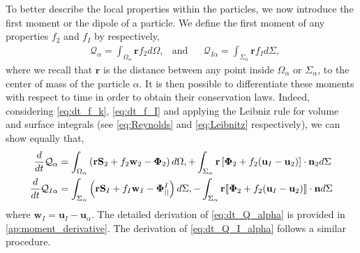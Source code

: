 To better describe the local properties within the particles, we now introduce the first moment or the dipole of a particle.
We define the first moment of any properties $f_2$ and $f_I$ by respectively,
\begin{align}
    &\mathcal{Q}_\alpha 
    = \int_{\Omega_\alpha} \textbf{r} f_2 d\Omega,
    &\text{and}&
    &\mathcal{Q}_{I\alpha}
    = \int_{\Sigma_\alpha} \textbf{r} f_I d\Sigma,
    \label{eq:first_moment_definition}
\end{align}
where we recall that $\textbf{r}$ is the distance between any point inside $\Omega_\alpha$ or $\Sigma_\alpha$, to the center of mass of the particle $\alpha$.
It is then possible to differentiate these moments with respect to time in order to obtain their conservation laws.
Indeed, considering \ref{eq:dt_f_k}, \ref{eq:dt_f_I} and applying the Leibniz rule for volume and surface integrals (see \ref{eq:Reynolds} and \ref{eq:Leibnitz} respectively), we can show equally that,
\begin{align}
    \frac{d}{d t} \mathcal{Q}_\alpha
    &= \int_{\Omega_\alpha} \left(
        \textbf{r} \textbf{S}_2         
        + f_2  \textbf{w}_2 
        - \mathbf{\Phi}_2
    \right) d\Omega,
    + \int_{\Sigma_\alpha} \textbf{r} \left[
        \mathbf{\Phi}_2
        + f_2 (\textbf{u}_I-\textbf{u}_2)
    \right]\cdot \textbf{n}_2  d\Sigma 
    \label{eq:dt_Q_alpha}\\
    \frac{d}{d t} \mathcal{Q}_{I\alpha}
    &= \int_{\Sigma_\alpha} \left(
        \textbf{r}\textbf{S}_I
        + f_I \textbf{w}_I
        - \mathbf{\Phi}_{||}^I
    \right) d\Sigma,
    - \int_{\Sigma_\alpha}\textbf{r} \llbracket \mathbf{\Phi}_2
        + f_2 (\textbf{u}_I - \textbf{u}_2)
     \rrbracket \cdot \textbf{n}
    d\Sigma
    \label{eq:dt_Q_I_alpha}
\end{align}
where $\textbf{w}_I = \textbf{u}_I - \textbf{u}_\alpha$.
The detailed derivation of \ref{eq:dt_Q_alpha} is provided in \ref{ap:moment_derivative}.
The derivation of \ref{eq:dt_Q_I_alpha} follows a similar procedure. 
